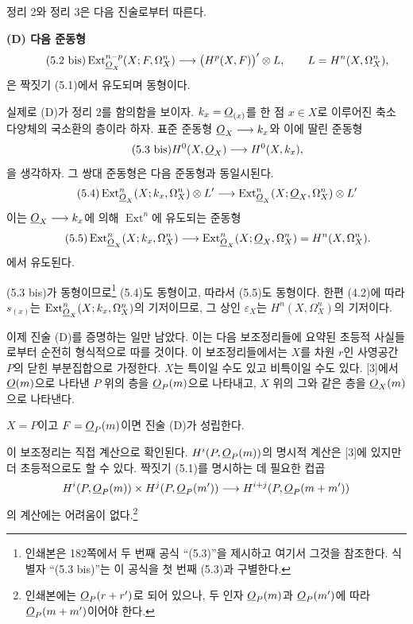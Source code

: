 정리 2와 정리 3은 다음 진술로부터 따른다.

\noindent\textbf{(D) 다음 준동형}
\begin{equation}\tag{5.2 bis}
  \operatorname{Ext}_{\underline{O}_X}^{n-p}(X;F,\Omega_X^{n})
  \longrightarrow\bigl(H^{p}(X,F)\bigr)'\otimes L,
  \qquad L=H^{n}(X,\Omega_X^{n}),
\end{equation}
은 짝짓기 (5.1)에서 유도되며 동형이다.

실제로 (D)가 정리 2를 함의함을 보이자. $k_x=\underline{O}_{(x)}$를 한 점
$x\in X$로 이루어진 축소 다양체의 국소환의 층이라 하자. 표준 준동형
$\underline{O}_X\longrightarrow k_x$와 이에 딸린 준동형
\begin{equation}\tag{5.3 bis}
  H^{0}(X,\underline{O}_X)\longrightarrow H^{0}(X,k_x),
\end{equation}
을 생각하자. 그 쌍대 준동형은 다음 준동형과 동일시된다.
\begin{equation}\tag{5.4}
  \operatorname{Ext}_{\underline{O}_X}^{n}(X;k_x,\Omega_X^{n})\otimes L'
  \longrightarrow
  \operatorname{Ext}_{\underline{O}_X}^{n}(X;\underline{O}_X,\Omega_X^{n})\otimes L'
\end{equation}
이는 $\underline{O}_X\longrightarrow k_x$에 의해 $\operatorname{Ext}^{n}$에
유도되는 준동형
\begin{equation}\tag{5.5}
  \operatorname{Ext}_{\underline{O}_X}^{n}(X;k_x,\Omega_X^{n})
  \longrightarrow
  \operatorname{Ext}_{\underline{O}_X}^{n}(X;\underline{O}_X,\Omega_X^{n})
  =H^{n}(X,\Omega_X^{n}).
\end{equation}
에서 유도된다.

(5.3 bis)가 동형이므로\footnote{인쇄본은 182쪽에서 두 번째 공식
“(5.3)”을 제시하고 여기서 그것을 참조한다. 식별자 “(5.3 bis)”는 이
공식을 첫 번째 (5.3)과 구별한다.} (5.4)도 동형이고, 따라서 (5.5)도
동형이다. 한편 (4.2)에 따라 $s_{(x)}$는
$\operatorname{Ext}_{\underline{O}_X}^{n}(X;k_x,\Omega_X^{n})$의 기저이므로, 그
상인 $\varepsilon_X$는 $H^{n}(X,\Omega_X^{n})$의 기저이다.

이제 진술 (D)를 증명하는 일만 남았다. 이는 다음 보조정리들에 요약된
초등적 사실들로부터 순전히 형식적으로 따를 것이다. 이 보조정리들에서는
$X$를 차원 $r$인 사영공간 $P$의 닫힌 부분집합으로 가정한다. $X$는
특이일 수도 있고 비특이일 수도 있다. [3]에서 $\underline{O}(m)$으로 나타낸 $P$
위의 층을 $\underline{O}_P(m)$으로 나타내고, $X$ 위의 그와 같은 층을
$\underline{O}_X(m)$으로 나타낸다.

 $X=P$이고 $F=\underline{O}_P(m)$이면 진술 (D)가 성립한다.

이 보조정리는 직접 계산으로 확인된다. $H^{i}(P,\underline{O}_P(m))$의 명시적
계산은 [3]에 있지만 더 초등적으로도 할 수 있다. 짝짓기 (5.1)를
명시하는 데 필요한 컵곱
\[
  H^{i}(P,\underline{O}_P(m))\times H^{j}(P,\underline{O}_P(m'))
  \longrightarrow H^{i+j}(P,\underline{O}_P(m+m'))
\]
의 계산에는 어려움이 없다.\footnote{인쇄본에는 $\underline{O}_P(r+r')$로 되어
있으나, 두 인자 $\underline{O}_P(m)$과 $\underline{O}_P(m')$에 따라
$\underline{O}_P(m+m')$이어야 한다.}


